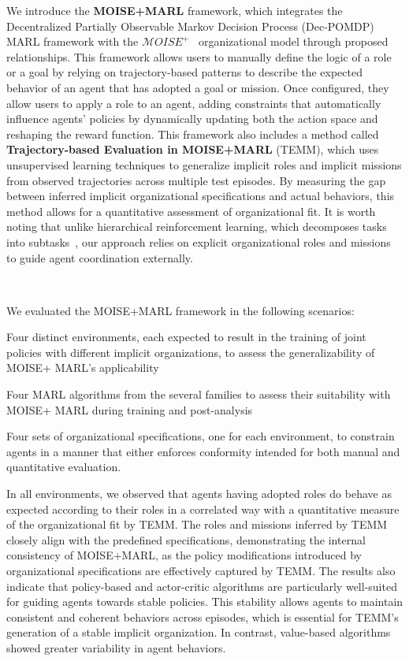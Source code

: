 \documentclass[sigconf]{aamas}
\begin{document}
\noindent We introduce the \textbf{MOISE+MARL} framework, which integrates the Decentralized Partially Observable Markov Decision Process (Dec-POMDP) MARL framework with the $\mathcal{M}OISE^+$~\cite{Hubner2007} organizational model through proposed relationships. This framework allows users to manually define the logic of a role or a goal by relying on trajectory-based patterns to describe the expected behavior of an agent that has adopted a goal or mission. Once configured, they allow users to apply a role to an agent, adding constraints that automatically influence agents' policies by dynamically updating both the action space and reshaping the reward function. This framework also includes a method called \textbf{Trajectory-based Evaluation in MOISE+MARL} (TEMM), which uses unsupervised learning techniques to generalize implicit roles and implicit missions from observed trajectories across multiple test episodes. By measuring the gap between inferred implicit organizational specifications and actual behaviors, this method allows for a quantitative assessment of organizational fit. It is worth noting that unlike hierarchical reinforcement learning, which decomposes tasks into subtasks~\cite{Qi2024, Matsuyama2025, SaoMai2024}, our approach relies on explicit organizational roles and missions to guide agent coordination externally.

\

We evaluated the MOISE+MARL framework in the following scenarios:
\begin{enumerate*}[label={\roman*) },itemjoin={; \quad}]
  \item Four distinct environments, each expected to result in the training of joint policies with different implicit organizations, to assess the generalizability of MOISE+ MARL's applicability
  \item Four MARL algorithms from the several families to assess their suitability with MOISE+ MARL during training and post-analysis
  \item Four sets of organizational specifications, one for each environment, to constrain agents in a manner that either enforces conformity intended for both manual and quantitative evaluation.
\end{enumerate*}

In all environments, we observed that agents having adopted roles do behave as expected according to their roles in a correlated way with a quantitative measure of the organizational fit by TEMM. The roles and missions inferred by TEMM closely align with the predefined specifications, demonstrating the internal consistency of MOISE+MARL, as the policy modifications introduced by organizational specifications are effectively captured by TEMM.
The results also indicate that policy-based and actor-critic algorithms are particularly well-suited for guiding agents towards stable policies. This stability allows agents to maintain consistent and coherent behaviors across episodes, which is essential for TEMM's generation of a stable implicit organization. In contrast, value-based algorithms showed greater variability in agent behaviors.
\end{document}
